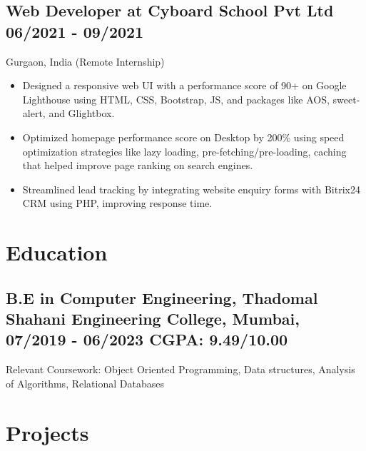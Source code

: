 \documentclass[a4,10pt]{article}
\newcommand{\subtext}[1]{
#1\par\vspace{-0.2cm}}
\newenvironment{zitemize}{
\begin{itemize}\itemsep0pt \parskip0pt \parsep1pt}
{\end{itemize}\vspace{-0.5cm}}
\begin{document}
\subsection*{Web Developer at Cyboard School Pvt Ltd \hfill 06/2021 - 09/2021} 
\subtext{Gurgaon, India {\normalsize\normalfont (Remote Internship) }}
    \begin{zitemize}
        \item Designed a responsive web UI with a performance score of 90+ on Google Lighthouse using HTML, CSS, Bootstrap, JS, and packages like AOS, sweet-alert, and Glightbox. 
        \item Optimized homepage performance score on Desktop by 200\% using speed optimization strategies like lazy loading, pre-fetching/pre-loading, caching that helped improve page ranking on search engines.
        \item Streamlined lead tracking by integrating website enquiry forms with Bitrix24 CRM using PHP, improving response time.
    \end{zitemize}




\section{Education }
\subsection*{B.E in Computer Engineering, {\normalsize \normalfont Thadomal Shahani Engineering College, Mumbai, 07/2019 - 06/2023} \hfill CGPA: 9.49/10.00} 
\subtext{{Relevant Coursework: Object Oriented Programming, Data structures, Analysis of Algorithms, Relational Databases} }


\section{Projects} 
\end{document}
